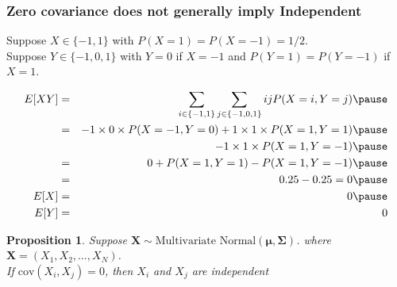 \documentclass{beamer}
\newtheorem{prop}{Proposition}
\numberwithin{equation}{section}
\begin{document}
\begin{frame}
\frametitle{Zero covariance does not \alert{generally} imply Independent}
Suppose $X \in \{-1, 1\}$ with $P(X = 1) = P(X = -1) = 1/2$.  \\
Suppose $Y \in \{-1, 0,1\}$ with $Y = 0 $ if $X = -1$ and $P(Y = 1) = P(Y= -1) $ if $X = 1$.  \\

\begin{small}
\begin{eqnarray}
E[XY] & = & \sum_{i \in \{-1, 1\} } \sum_{j \in \{-1, 0, 1\}} i j P(X = i, Y = j) \nonumber \pause\\
& = & -1 \times 0 \times  P(X = -1, Y = 0) + 1 \times 1  \times P(X = 1, Y = 1)  \nonumber  \pause\\
 && - 1 \times 1 \times P(X = 1, Y = -1) \nonumber  \pause\\
 &= & 0 + P(X = 1, Y = 1)  - P(X = 1, Y = -1 ) \nonumber  \pause\\
  & = &  0.25 - 0.25 = 0  \nonumber  \pause\\
E[X] & = &  0 \nonumber  \pause \\
E[Y] & = & 0 \nonumber 
\end{eqnarray}

\end{small}



\end{frame}


\begin{frame}

\begin{prop}
Suppose $\boldsymbol{X} \sim \text{Multivariate Normal}(\boldsymbol{\mu}, \boldsymbol{\Sigma})$.  
where $\boldsymbol{X}= (X_{1}, X_{2}, \hdots, X_{N})$.  \pause\\
If $\text{cov}(X_{i}, X_{j})  = 0  $, then $X_{i}$ and $X_{j}$ are independent 

\end{prop}



\end{frame}
\end{document}
